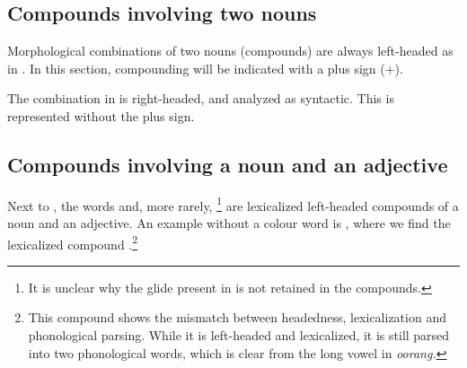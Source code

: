 \subsection{Compounds involving two nouns}\label{sec:wofo:Compoundsinvolvingtwonouns}

Morphological combinations of two nouns (compounds) are always left-headed as in . In this section, compounding will  be indicated with a plus sign (+).

 





The combination in  is right-headed, and analyzed as syntactic. This is represented without the plus sign.


 
% 
% 



\subsection{Compounds involving a noun and an adjective}\label{sec:wofo:CompoundsinvolvingNandAdj}
Next to , the words  and, more rarely, \footnote{It is unclear why the glide present in  is not retained in the compounds.} are lexicalized left-headed compounds of a noun and an adjective. An example without a colour word is , where we find the lexicalized compound .\footnote{This compound shows the mismatch between headedness, lexicalization and phonological parsing. While it is left-headed and lexicalized, it is still parsed into two phonological words, which is clear from the long vowel in \em oorang\em.}

